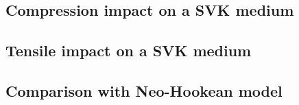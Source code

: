\subsection{Compression impact on a SVK medium}
\subsection{Tensile impact on a SVK medium}
\subsection{Comparison with Neo-Hookean model}


